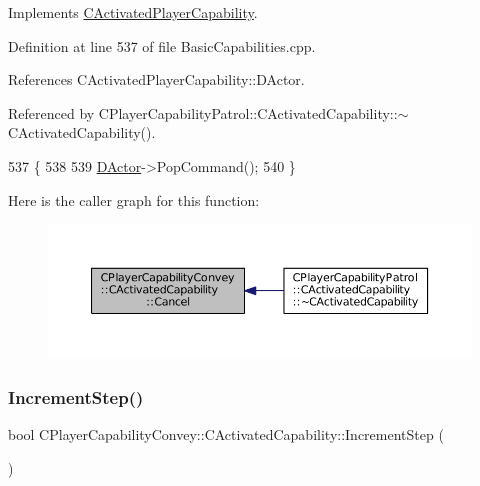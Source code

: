 Implements \hyperlink{classCActivatedPlayerCapability_a5cde83be468e262ad054d81e28684a81}{C\+Activated\+Player\+Capability}.



Definition at line 537 of file Basic\+Capabilities.\+cpp.



References C\+Activated\+Player\+Capability\+::\+D\+Actor.



Referenced by C\+Player\+Capability\+Patrol\+::\+C\+Activated\+Capability\+::$\sim$\+C\+Activated\+Capability().


\begin{DoxyCode}
537                                                         \{
538 
539     \hyperlink{classCActivatedPlayerCapability_a54ca944b47bff2718330639941d402b0}{DActor}->PopCommand();
540 \}
\end{DoxyCode}
Here is the caller graph for this function\+:\nopagebreak
\begin{figure}[H]
\begin{center}
\leavevmode
\includegraphics[width=350pt]{classCPlayerCapabilityConvey_1_1CActivatedCapability_ad84a94a1ae3647ea160e262a0154e229_icgraph}
\end{center}
\end{figure}
\hypertarget{classCPlayerCapabilityConvey_1_1CActivatedCapability_ac1bf251eca552885041b1bcefa594591}{}\label{classCPlayerCapabilityConvey_1_1CActivatedCapability_ac1bf251eca552885041b1bcefa594591} 
\subsubsection{\texorpdfstring{Increment\+Step()}{IncrementStep()}}
{\footnotesize\ttfamily bool C\+Player\+Capability\+Convey\+::\+C\+Activated\+Capability\+::\+Increment\+Step (\begin{DoxyParamCaption}{ }\end{DoxyParamCaption})\hspace{0.3cm}{\ttfamily [virtual]}}



